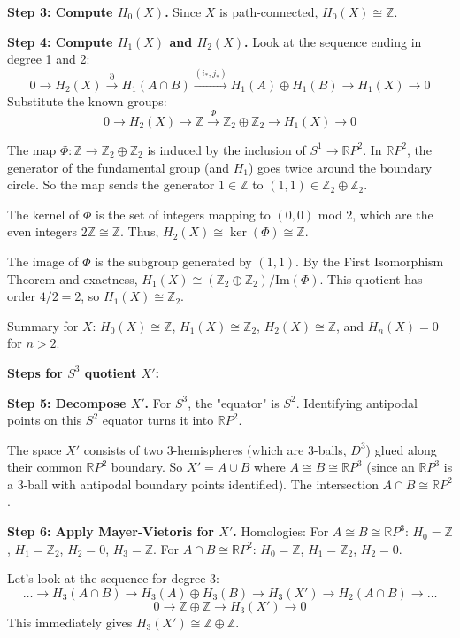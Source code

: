 \begin{solution}
\textbf{Step 3: Compute $H_0(X)$.}
Since $X$ is path-connected, $H_0(X) \cong \mathbb{Z}$.

\textbf{Step 4: Compute $H_1(X)$ and $H_2(X)$.}
Look at the sequence ending in degree 1 and 2:
\[ 0 \to H_2(X) \xrightarrow{\partial} H_1(A \cap B) \xrightarrow{(i_*, j_*)} H_1(A) \oplus H_1(B) \to H_1(X) \to 0 \]
Substitute the known groups:
\[ 0 \to H_2(X) \to \mathbb{Z} \xrightarrow{\Phi} \mathbb{Z}_2 \oplus \mathbb{Z}_2 \to H_1(X) \to 0 \]

The map $\Phi: \mathbb{Z} \to \mathbb{Z}_2 \oplus \mathbb{Z}_2$ is induced by the inclusion of $S^1 \to \mathbb{R}P^2$. In $\mathbb{R}P^2$, the generator of the fundamental group (and $H_1$) goes twice around the boundary circle. So the map sends the generator $1 \in \mathbb{Z}$ to $(1, 1) \in \mathbb{Z}_2 \oplus \mathbb{Z}_2$.

The kernel of $\Phi$ is the set of integers mapping to $(0,0)$ mod 2, which are the even integers $2\mathbb{Z} \cong \mathbb{Z}$. Thus, $H_2(X) \cong \ker(\Phi) \cong \mathbb{Z}$.

The image of $\Phi$ is the subgroup generated by $(1,1)$. By the First Isomorphism Theorem and exactness, $H_1(X) \cong (\mathbb{Z}_2 \oplus \mathbb{Z}_2) / \text{Im}(\Phi)$. This quotient has order $4/2 = 2$, so $H_1(X) \cong \mathbb{Z}_2$.

Summary for $X$: $H_0(X) \cong \mathbb{Z}$, $H_1(X) \cong \mathbb{Z}_2$, $H_2(X) \cong \mathbb{Z}$, and $H_n(X) = 0$ for $n > 2$.

\textbf{Steps for $S^3$ quotient $X'$:}

\textbf{Step 5: Decompose $X'$.}
For $S^3$, the "equator" is $S^2$. Identifying antipodal points on this $S^2$ equator turns it into $\mathbb{R}P^2$. 

The space $X'$ consists of two 3-hemispheres (which are 3-balls, $D^3$) glued along their common $\mathbb{R}P^2$ boundary. So $X' = A \cup B$ where $A \cong B \cong \mathbb{R}P^3$ (since an $\mathbb{R}P^3$ is a 3-ball with antipodal boundary points identified). The intersection $A \cap B \cong \mathbb{R}P^2$.

\textbf{Step 6: Apply Mayer-Vietoris for $X'$.}
Homologies:
For $A \cong B \cong \mathbb{R}P^3$: $H_0 = \mathbb{Z}$, $H_1 = \mathbb{Z}_2$, $H_2 = 0$, $H_3 = \mathbb{Z}$.
For $A \cap B \cong \mathbb{R}P^2$: $H_0 = \mathbb{Z}$, $H_1 = \mathbb{Z}_2$, $H_2 = 0$.

Let's look at the sequence for degree 3:
\[ \dots \to H_3(A \cap B) \to H_3(A) \oplus H_3(B) \to H_3(X') \to H_2(A \cap B) \to \dots \]
\[ 0 \to \mathbb{Z} \oplus \mathbb{Z} \to H_3(X') \to 0 \]
This immediately gives $H_3(X') \cong \mathbb{Z} \oplus \mathbb{Z}$.


\end{solution}
